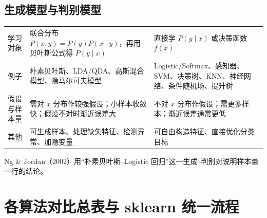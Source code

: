 \subsection{生成模型与判别模型}
\begin{center}\small
\begin{tabularx}{\linewidth}{@{}p{1.6cm}LL@{}}
\toprule
&  &  \\
\midrule
学习对象 & 联合分布 $P(x,y)=P(y)P(x\mid y)$，再用贝叶斯公式得 $P(y\mid x)$ & 直接学 $P(y\mid x)$ 或决策函数 $f(x)$ \\
例子 & 朴素贝叶斯、LDA/QDA、高斯混合模型、隐马尔可夫模型 & Logistic/Softmax、感知器、SVM、决策树、KNN、神经网络、条件随机场、提升树 \\
假设与样本量 & 需对 $x$ 分布作较强假设；小样本收敛快；假设不对时渐近误差大 & 不对 $x$ 分布作假设；需更多样本；渐近误差通常更低 \\
其他 & 可生成样本、处理缺失特征、检测异常、加隐变量 & 可自由构造特征、直接优化分类目标 \\
\bottomrule
\end{tabularx}
\end{center}
Ng \& Jordan（2002）用“朴素贝叶斯–Logistic 回归”这一生成–判别对说明样本量一行的结论。

\section{各算法对比总表与 sklearn 统一流程}

